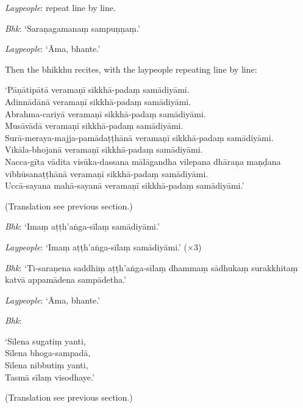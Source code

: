 \emph{Laypeople}: repeat line by line.

\emph{Bhk}: ‘Saraṇagamanaṃ sampuṇṇaṃ.’

\emph{Laypeople}: ‘Āma, bhante.’

Then the bhikkhu recites, with the laypeople repeating line by line:

‘Pāṇātipātā veramaṇī sikkhā-padaṃ samādiyāmi.\\
Adinnādānā veramaṇī sikkhā-padaṃ samādiyāmi.\\
Abrahma-cariyā veramaṇī sikkhā-padaṃ samādiyāmi.\\
Musāvādā veramaṇī sikkhā-padaṃ samādiyāmi.\\
Surā-meraya-majja-pamādaṭṭhānā veramaṇī sikkhā-padaṃ samādiyāmi.\\
Vikāla-bhojanā veramaṇī sikkhā-padaṃ samādiyāmi.\\
Nacca-gīta vādita visūka-dassana mālāgandha vilepana dhāraṇa maṇḍana
vibhūsanaṭṭhānā veramaṇī sikkhā-padaṃ samādiyāmi.\\
Uccā-sayana mahā-sayanā veramaṇī sikkhā-padaṃ samādiyāmi.’


(Translation see previous section.)

\emph{Bhk}: ‘Imaṃ aṭṭh'aṅga-sīlaṃ samādiyāmi.’

\emph{Laypeople}: ‘Imaṃ aṭṭh'aṅga-sīlaṃ samādiyāmi.’ (×3)

\emph{Bhk}: ‘Ti-saraṇena saddhiṃ aṭṭh'aṅga-sīlaṃ dhammaṃ sādhukaṃ surakkhitaṃ
katvā appamādena sampādetha.’

\emph{Laypeople}: ‘Āma, bhante.’

\emph{Bhk}:

‘Sīlena sugatiṃ yanti,\\
Sīlena bhoga-sampadā,\\
Sīlena nibbutiṃ yanti,\\
Tasmā sīlaṃ visodhaye.’

(Translation see previous section.)


